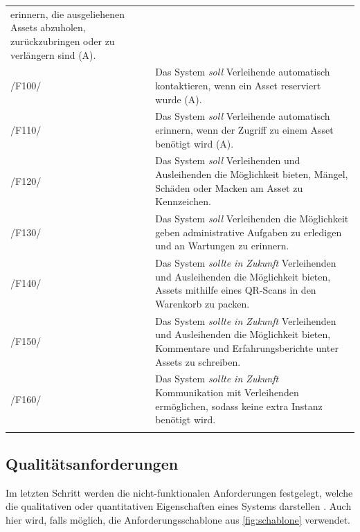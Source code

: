 \begin{center}
\begin{longtable}{lp{}}
                 erinnern, die ausgeliehenen Assets abzuholen, zurückzubringen oder zu verlängern
                 sind (A). \\
                 \sffamily\color{maincolor}/F100/  & Das System \textit{soll} Verleihende automatisch
                 kontaktieren, wenn ein Asset reserviert wurde (A). \\
                 \sffamily\color{maincolor}/F110/  & Das System \textit{soll} Verleihende
                 automatisch erinnern, wenn der Zugriff zu einem Asset benötigt wird (A). \\
                 \sffamily\color{maincolor}/F120/ & Das System \textit{soll} Verleihenden und
                 Ausleihenden die Möglichkeit bieten, Mängel, Schäden oder Macken am Asset zu
                 Kennzeichen. \\
                 \sffamily\color{maincolor}/F130/  & Das System \textit{soll} Verleihenden die
                 Möglichkeit geben administrative Aufgaben zu erledigen und an Wartungen zu
                 erinnern. \\
                 \sffamily\color{maincolor}/F140/ &   Das System \textit{sollte in Zukunft}
                 Verleihenden und Ausleihenden die Möglichkeit bieten, Assets mithilfe eines
                 QR-Scans in den Warenkorb zu packen.\\
                 \sffamily\color{maincolor}/F150/  & Das System \textit{sollte in Zukunft}
                 Verleihenden und Ausleihenden die Möglichkeit bieten, Kommentare und
                 Erfahrungsberichte unter Assets zu schreiben. \\
                 \sffamily\color{maincolor}/F160/ & Das System \textit{sollte in Zukunft}
                 Kommunikation mit Verleihenden ermöglichen, sodass keine extra Instanz benötigt
                 wird. \\
                \arrayrulecolor{maincolor}\hline
        \end{longtable}
\end{center}

\vspace*{-1.5cm}
\subsection{Qualitätsanforderungen}
\label{section:qualität}
Im letzten Schritt werden die nicht-funktionalen Anforderungen festgelegt, welche die qualitativen
oder quantitativen Eigenschaften eines Systems darstellen \cite{balzert2009}. Auch hier wird, falls
möglich, die Anforderungsschablone aus \ref{fig:schablone} verwendet.

